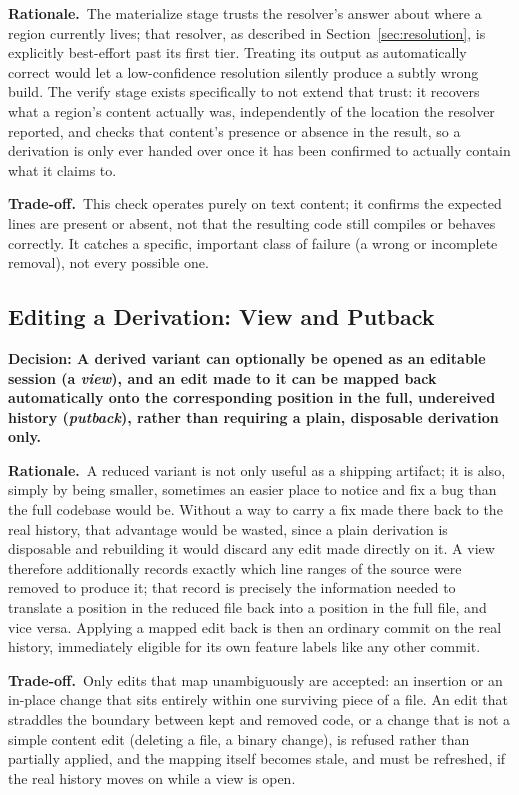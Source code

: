 \documentclass[11pt]{article}
\newcommand{\decision}[1]{\medskip\noindent\textbf{Decision: #1}\par\nopagebreak\smallskip}
\newcommand{\rationale}{\noindent\textbf{Rationale.}\ }
\newcommand{\tradeoff}{\noindent\textbf{Trade-off.}\ }
\begin{document}
\rationale The materialize stage trusts the resolver's answer about
where a region currently lives; that resolver, as described in
Section~\ref{sec:resolution}, is explicitly best-effort past its first
tier. Treating its output as automatically correct would let a
low-confidence resolution silently produce a subtly wrong build. The
verify stage exists specifically to not extend that trust: it recovers
what a region's content actually was, independently of the location the
resolver reported, and checks that content's presence or absence in the
result, so a derivation is only ever handed over once it has been
confirmed to actually contain what it claims to.

\tradeoff This check operates purely on text content; it confirms the
expected lines are present or absent, not that the resulting code still
compiles or behaves correctly. It catches a specific, important class of
failure (a wrong or incomplete removal), not every possible one.

\subsection{Editing a Derivation: View and Putback}

\decision{A derived variant can optionally be opened as an editable
session (a \emph{view}), and an edit made to it can be mapped back
automatically onto the corresponding position in the full, undereived
history (\emph{putback}), rather than requiring a plain, disposable
derivation only.}

\rationale A reduced variant is not only useful as a shipping artifact;
it is also, simply by being smaller, sometimes an easier place to notice
and fix a bug than the full codebase would be. Without a way to carry a
fix made there back to the real history, that advantage would be wasted,
since a plain derivation is disposable and rebuilding it would discard
any edit made directly on it. A view therefore additionally records
exactly which line ranges of the source were removed to produce it; that
record is precisely the information needed to translate a position in the
reduced file back into a position in the full file, and vice versa.
Applying a mapped edit back is then an ordinary commit on the real
history, immediately eligible for its own feature labels like any other
commit.

\tradeoff Only edits that map unambiguously are accepted: an insertion
or an in-place change that sits entirely within one surviving piece of a
file. An edit that straddles the boundary between kept and removed code,
or a change that is not a simple content edit (deleting a file, a binary
change), is refused rather than partially applied, and the mapping
itself becomes stale, and must be refreshed, if the real history moves on
while a view is open.
\end{document}
